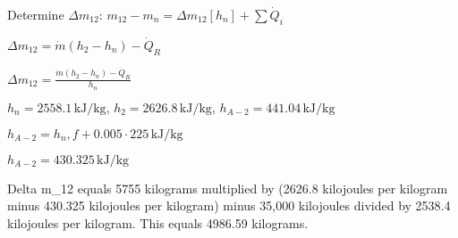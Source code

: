 Determine \( \Delta m_{12} \):  
\( m_{12} - m_n = \Delta m_{12} [h_n] + \sum \dot{Q}_i \)  

\( \Delta m_{12} = \dot{m} (h_2 - h_n) - \dot{Q}_R \)  

\( \Delta m_{12} = \frac{\dot{m} (h_2 - h_n) - \dot{Q}_R}{h_n} \)  

\( h_n = 2558.1 \, \text{kJ/kg}, \, h_2 = 2626.8 \, \text{kJ/kg}, \, h_{A-2} = 441.04 \, \text{kJ/kg} \)  

\( h_{A-2} = h_n,f + 0.005 \cdot 225 \, \text{kJ/kg} \)  

\( h_{A-2} = 430.325 \, \text{kJ/kg} \)

Delta m_12 equals 5755 kilograms multiplied by (2626.8 kilojoules per kilogram minus 430.325 kilojoules per kilogram) minus 35,000 kilojoules divided by 2538.4 kilojoules per kilogram.  
This equals 4986.59 kilograms.